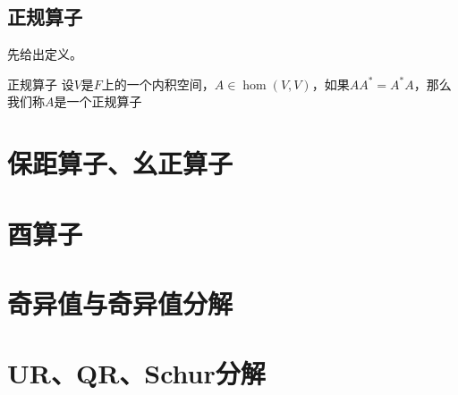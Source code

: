 \documentclass[12pt, a4paper, oneside, UTF8]{ctexbook}
\begin{document}
		\subsection{正规算子}
			先给出定义。
			\begin{defn}{正规算子}{}
				设$V$是$F$上的一个内积空间，$A \in \hom(V,V)$，如果$AA^*=A^*A$，那么我们称$A$是一个正规算子
			\end{defn}
	\section{保距算子、幺正算子}
	\section{酉算子}
	\section{奇异值与奇异值分解}
	\section{UR、QR、Schur分解}
\ifx\allfiles\undefined
\end{document}
